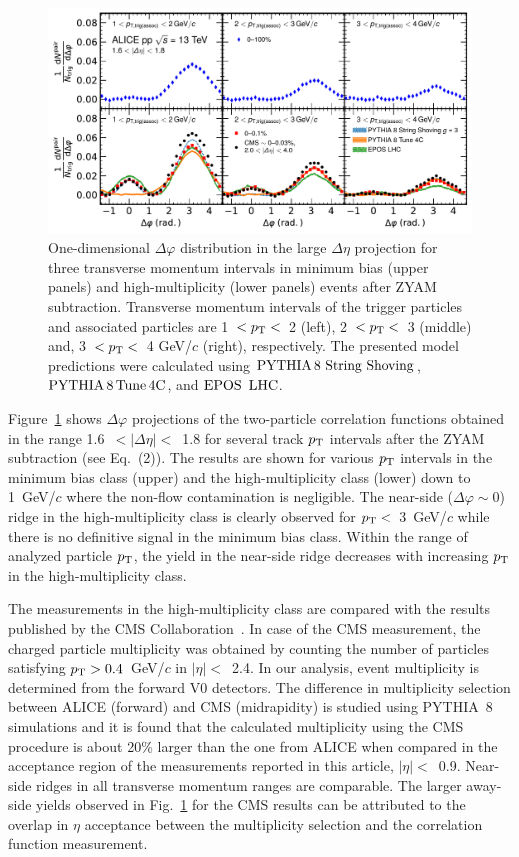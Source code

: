 \begin{figure}[h!]
	\centering
	\includegraphics[width=0.9\linewidth]{./figures/Fig2_PlotDeltaPhi.pdf}
	\caption{One-dimensional $\Delta\varphi$ distribution in the large $\Delta\eta$ projection for three transverse momentum intervals in minimum bias (upper panels) and high-multiplicity (lower panels) events after ZYAM subtraction. Transverse momentum intervals of the trigger particles and associated particles are 1~$<p_\mathrm{T}<$~2 (left), 2~$<p_\mathrm{T}<$~3 (middle) and, 3~$<p_\mathrm{T}<$~4 GeV/$c$ (right), respectively. The presented model predictions were calculated using ${\mathrm{PYTHIA}\,8~\mathrm{String}~}\mathrm{Shoving}$, $\mathrm{PYTHIA}\,8\,\mathrm{Tune\,4C}$, and ${\mathrm{EPOS}\,~\mathrm{LHC}}$.}
	\label{fig:PlotDeltaPhi}
\end{figure}
 
Figure~\ref{fig:PlotDeltaPhi} shows $\Delta\varphi$ projections of the two-particle correlation functions obtained in the range 1.6~$<|\Delta \eta |<$~1.8 for several track $p_\mathrm{T}$ intervals after the ZYAM subtraction (see Eq.~(2)). The results are shown for various $\it{p}_{\rm{T}}$ intervals in the minimum bias class (upper) and the high-multiplicity class (lower) down to 1~GeV/$c$ where the non-flow contamination is negligible. The near-side ($\Delta\varphi\sim 0$) ridge in the high-multiplicity class is clearly observed for $p_\mathrm{T}<$~3~GeV/$c$ while there is no definitive signal in the minimum bias class. Within the range of analyzed particle $p_\mathrm{T}$, the yield in the near-side ridge decreases with increasing $p_\mathrm{T}$ in the high-multiplicity class.

The measurements in the high-multiplicity class are compared with the results published by the CMS Collaboration~\cite{Khachatryan:2015lva}. In case of the CMS measurement, the charged particle multiplicity was obtained by counting the number of particles satisfying $p_\mathrm{T}>0.4$~GeV/$c$ in $|\eta|<$~2.4. In our analysis, event multiplicity is determined from the forward V0 detectors. The difference in multiplicity selection between ALICE (forward) and CMS (midrapidity) is studied using PYTHIA~8 simulations and it is found that the calculated multiplicity using the CMS procedure is about 20\% larger than the one from ALICE when compared in the acceptance region of the measurements reported in this article, $|\eta|<$~0.9. Near-side ridges in all transverse momentum ranges are comparable. The larger away-side yields observed in Fig.~\ref{fig:PlotDeltaPhi} for the CMS results can be attributed to the overlap in $\eta$ acceptance between the multiplicity selection and the correlation function measurement.

